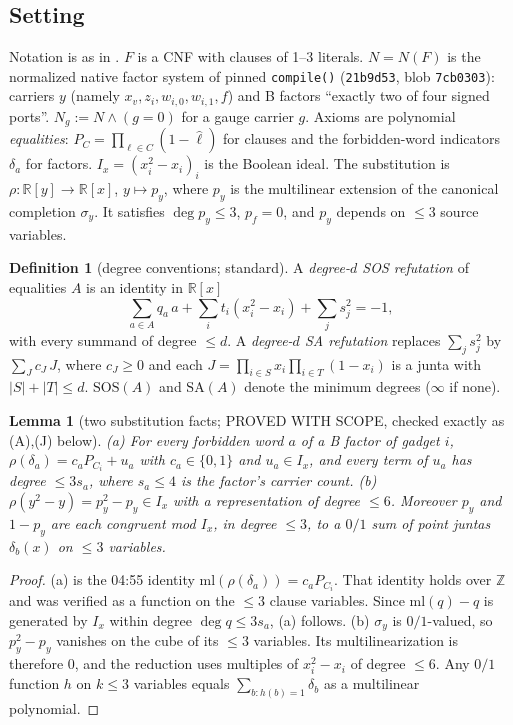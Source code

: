 \documentclass[11pt]{article}
\newtheorem{lemma}[theorem]{Lemma}
\theoremstyle{definition}
\newtheorem{definition}[theorem]{Definition}
\newcommand{\SOS}{\mathrm{SOS}}
\newcommand{\SA}{\mathrm{SA}}
\newcommand{\ml}{\mathrm{ml}}
\begin{document}
\subsection*{Setting}
Notation is as in . $F$ is a CNF with clauses of 1--3 literals. $N=N(F)$ is the normalized native factor system of pinned \texttt{compile()} (\texttt{21b9d53}, blob \texttt{7cb0303}): carriers $y$ (namely $x_v,z_i,w_{i,0},w_{i,1},f$) and B factors ``exactly two of four signed ports''. $N_g:=N\wedge(g=0)$ for a gauge carrier $g$. Axioms are polynomial \emph{equalities}: $P_C=\prod_{\ell\in C}(1-\hat\ell)$ for clauses and the forbidden-word indicators $\delta_a$ for factors. $I_x=(x_i^2-x_i)_i$ is the Boolean ideal. The substitution is $\rho:\mathbb R[y]\to\mathbb R[x]$, $y\mapsto p_y$, where $p_y$ is the multilinear extension of the canonical completion $\sigma_y$. It satisfies $\deg p_y\le3$, $p_f=0$, and $p_y$ depends on $\le3$ source variables.

\begin{definition}[degree conventions; standard]
A \emph{degree-$d$ SOS refutation} of equalities $A$ is an identity in $\mathbb R[x]$
\[\textstyle\sum_{a\in A}q_a\,a+\sum_i t_i(x_i^2-x_i)+\sum_j s_j^2=-1,\]
with every summand of degree $\le d$. A \emph{degree-$d$ SA refutation} replaces $\sum_j s_j^2$ by $\sum_J c_J\,J$, where $c_J\ge0$ and each $J=\prod_{i\in S}x_i\prod_{i\in T}(1-x_i)$ is a junta with $|S|+|T|\le d$. $\SOS(A)$ and $\SA(A)$ denote the minimum degrees ($\infty$ if none).
\end{definition}

\begin{lemma}[two substitution facts; PROVED WITH SCOPE, checked exactly as (A),(J) below]\label{lem:facts}
(a) For every forbidden word $a$ of a B factor of gadget $i$, $\rho(\delta_a)=c_a P_{C_i}+u_a$ with $c_a\in\{0,1\}$ and $u_a\in I_x$, and every term of $u_a$ has degree $\le3s_a$, where $s_a\le4$ is the factor's carrier count. (b) $\rho(y^2-y)=p_y^2-p_y\in I_x$ with a representation of degree $\le6$. Moreover $p_y$ and $1-p_y$ are each congruent mod $I_x$, in degree $\le3$, to a $0/1$ sum of point juntas $\delta_b(x)$ on $\le3$ variables.
\end{lemma}
\begin{proof}
(a) is the 04:55 identity $\ml(\rho(\delta_a))=c_aP_{C_i}$. That identity holds over $\mathbb Z$ and was verified as a function on the $\le3$ clause variables. Since $\ml(q)-q$ is generated by $I_x$ within degree $\deg q\le 3s_a$, (a) follows. (b) $\sigma_y$ is $0/1$-valued, so $p_y^2-p_y$ vanishes on the cube of its $\le3$ variables. Its multilinearization is therefore $0$, and the reduction uses multiples of $x_i^2-x_i$ of degree $\le6$. Any $0/1$ function $h$ on $k\le3$ variables equals $\sum_{b:h(b)=1}\delta_b$ as a multilinear polynomial.
\end{proof}
\end{document}
